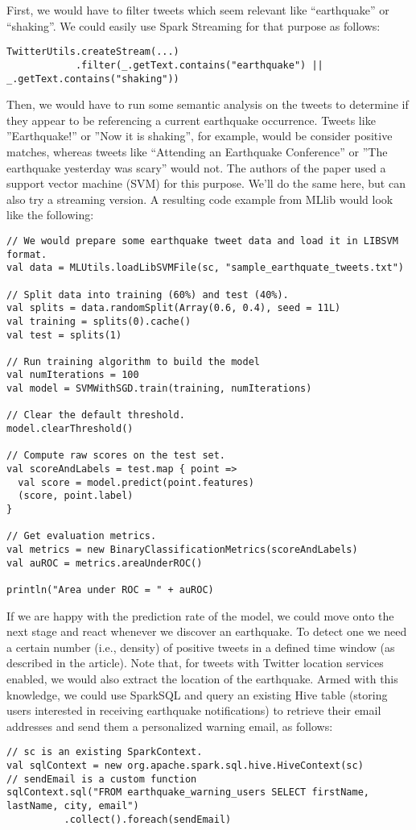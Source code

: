 \documentclass[a4paper,12pt]{article}
\begin{document}
First, we would have to filter tweets which seem relevant like “earthquake” or “shaking”. We could easily use Spark Streaming for that purpose as follows:
\begin{verbatim}
TwitterUtils.createStream(...)
            .filter(_.getText.contains("earthquake") || _.getText.contains("shaking"))
\end{verbatim}            
Then, we would have to run some semantic analysis on the tweets to determine if they appear to be referencing a current earthquake occurrence. Tweets like ”Earthquake!” or ”Now it is shaking”, for example, would be consider positive matches, whereas tweets like “Attending an Earthquake Conference” or ”The earthquake yesterday was scary” would not. The authors of the paper used a support vector machine (SVM) for this purpose. We’ll do the same here, but can also try a streaming version. A resulting code example from MLlib would look like the following:
\begin{verbatim}
// We would prepare some earthquake tweet data and load it in LIBSVM format.
val data = MLUtils.loadLibSVMFile(sc, "sample_earthquate_tweets.txt")

// Split data into training (60%) and test (40%).
val splits = data.randomSplit(Array(0.6, 0.4), seed = 11L)
val training = splits(0).cache()
val test = splits(1)

// Run training algorithm to build the model
val numIterations = 100
val model = SVMWithSGD.train(training, numIterations)

// Clear the default threshold.
model.clearThreshold()

// Compute raw scores on the test set. 
val scoreAndLabels = test.map { point =>
  val score = model.predict(point.features)
  (score, point.label)
}

// Get evaluation metrics.
val metrics = new BinaryClassificationMetrics(scoreAndLabels)
val auROC = metrics.areaUnderROC()

println("Area under ROC = " + auROC)
\end{verbatim}
If we are happy with the prediction rate of the model, we could move onto the next stage and react whenever we discover an earthquake. To detect one we need a certain number (i.e., density) of positive tweets in a defined time window (as described in the article). Note that, for tweets with Twitter location services enabled, we would also extract the location of the earthquake. Armed with this knowledge, we could use SparkSQL and query an existing Hive table (storing users interested in receiving earthquake notifications) to retrieve their email addresses and send them a personalized warning email, as follows:
\begin{verbatim}
// sc is an existing SparkContext.
val sqlContext = new org.apache.spark.sql.hive.HiveContext(sc)
// sendEmail is a custom function
sqlContext.sql("FROM earthquake_warning_users SELECT firstName, lastName, city, email")
          .collect().foreach(sendEmail)
\end{verbatim}
\end{document}
